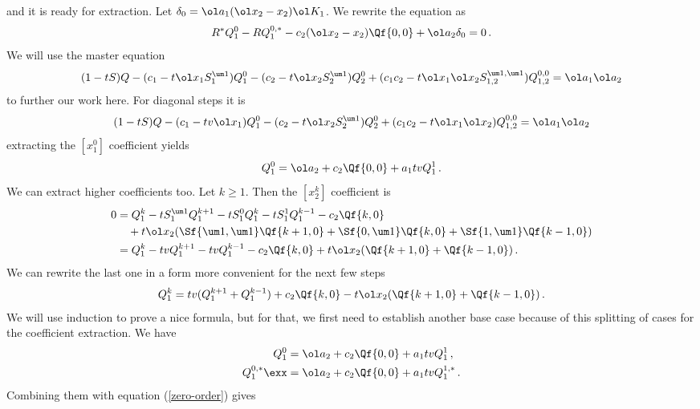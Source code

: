 and it is ready for extraction. Let $\delta_0 =  \ol a_1(\ol x_2-x_2)\ol K_1$. We rewrite the equation as
\begin{align}\label{zero-order}
    R^\ast Q_1^0 -R Q_1^{0,\ast} - c_2(\ol x_2-x_2)\Qf{0,0} + \ol a_2\delta_0 = 0\,.
\end{align}
We will use the master equation
\begin{align}
(1-tS)Q - (c_1-t\ol x_1S_1^{\um 1}) Q_1^0- (c_2-t\ol x_2S_2^{\um 1}) Q_2^0+ (c_1c_2-t\ol x_1\ol x_2S_{1,2}^{\um 1,\um 1})Q_{1,2}^{0,0}  = \ol a_1\ol a_2
\end{align}
to further our work here. For diagonal steps it is
\begin{align}
 (1-tS)Q - (c_1-tv\ol x_1) Q_1^0- (c_2-t\ol x_2S_2^{\um 1}) Q_2^0+ (c_1c_2-t\ol x_1\ol x_2)Q_{1,2}^{0,0}  = \ol a_1\ol a_2
\end{align}
extracting the $[x_1^0]$ coefficient yields
\begin{align}
   Q_1^0 =  \ol a_2+c_2\Qf{0,0} + a_1tvQ_1^1\,.
\end{align}
We can extract higher coefficients too. Let $k\geq 1$. Then the $[x_2^k]$ coefficient is
\begin{align}\begin{split}
	0 &= Q_1^k-tS_{1}^{\um 1}Q_1^{k+1}-tS_1^{0}Q_1^k-tS_1^1Q_1^{k-1}-c_2\Qf{k,0} \\ 
	   &\quad+ t\ol x_2(\Sf{\um 1,\um 1}\Qf{k+1,0}+\Sf{0,\um 1}\Qf{k,0}+\Sf{1,\um 1}\Qf{k-1,0})\\
	   &=Q_1^k-tvQ_1^{k+1}-tvQ_1^{k-1}-c_2\Qf{k,0} + t\ol x_2(\Qf{k+1,0}+\Qf{k-1,0})\,.
\end{split}\end{align}
We can rewrite the last one in a form more convenient for the next few steps
\begin{align}\label{formula}
	Q_1^k = tv(Q_1^{k+1}+Q_1^{k-1}) + c_2 \Qf{k,0} - t\ol x_2(\Qf{k+1,0}+\Qf{k-1,0})\,.
\end{align}
We will use induction to prove a nice formula, but for that, we first need to establish another base case because of this splitting of cases for the coefficient extraction. We have
\begin{align}
	Q_1^0 &=  \ol a_2+c_2\Qf{0,0} + a_1tvQ_1^1\,,\\
	Q_1^{0,\ast} \exx&=  \ol a_2+c_2\Qf{0,0} + a_1tvQ_1^{1,\ast}\,.
\end{align}
Combining them with equation (\ref{zero-order}) gives

